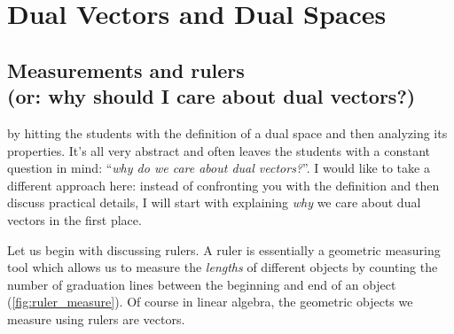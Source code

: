 \section{Dual Vectors and Dual Spaces}

\subsection{Measurements and rulers\\(or: why should I care about dual vectors?)}
 by hitting the students with the definition of a dual space and then analyzing its properties. It's all very abstract and often leaves the students with a constant question in mind: \enquote{\textit{why do we care about dual vectors?}}.
I would like to take a different approach here: instead of confronting you with the definition and then discuss practical details, I will start with explaining \textit{why} we care about dual vectors in the first place.

Let us begin with discussing rulers. A ruler is essentially a geometric measuring tool which allows us to measure the \textit{lengths} of different objects by counting the number of graduation lines between the beginning and end of an object (\cref{fig:ruler_measure}). Of course in linear algebra, the geometric objects we measure using rulers are vectors.

